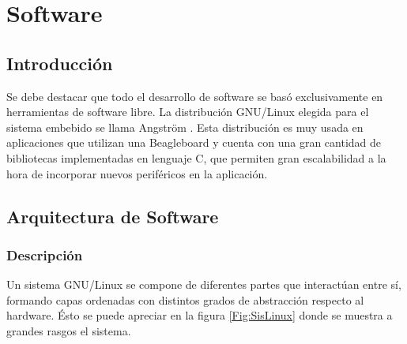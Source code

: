 \chapter{Software}

\section{Introducción}
Se debe destacar que todo el desarrollo de software se basó exclusivamente en herramientas de software libre. La distribución GNU/Linux elegida para el sistema embebido se llama Angström \cite{Angs}. Esta distribución es muy usada en aplicaciones que utilizan una Beagleboard y cuenta con una gran cantidad de bibliotecas implementadas en lenguaje C, que permiten gran escalabilidad a la hora de incorporar nuevos periféricos en la aplicación.

\section{Arquitectura de Software}
\subsection{Descripción}
Un sistema GNU/Linux se compone de diferentes partes que interactúan entre sí, formando capas ordenadas con distintos grados de abstracción respecto al hardware. Ésto se puede apreciar en la figura \ref{Fig:SisLinux} donde se muestra a grandes rasgos el sistema. 


